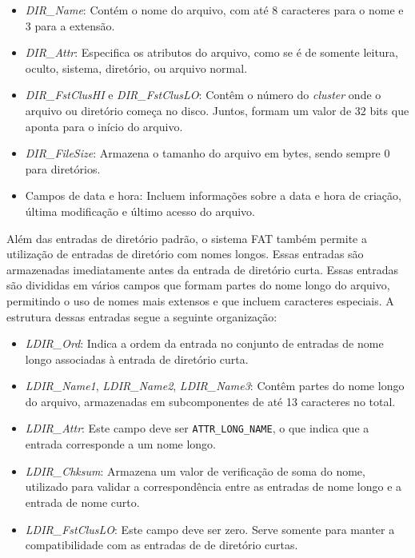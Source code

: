 \documentclass[
    12pt,				%
    oneside,   	        %
    a4paper,			%
    english,			%
    french,				%
    spanish,			%
    brazil,				%
    ]{pacotes/abntex2}
\begin{document}
\begin{itemize} 
    \item \textit{DIR\_Name}: Contém o nome do arquivo, com até 8 caracteres para o nome e 3 para a extensão. 
    \item \textit{DIR\_Attr}: Especifica os atributos do arquivo, como se é de somente leitura, oculto, sistema, diretório, ou arquivo normal.
    \item \textit{DIR\_FstClusHI} e \textit{DIR\_FstClusLO}: Contêm o número do \textit{cluster} onde o arquivo ou diretório começa no disco. Juntos, formam um valor de 32 bits que aponta para o início do arquivo. 
    \item \textit{DIR\_FileSize}: Armazena o tamanho do arquivo em bytes, sendo sempre 0 para diretórios. 
    \item Campos de data e hora: Incluem informações sobre a data e hora de criação, última modificação e último acesso do arquivo. 
\end{itemize}

Além das entradas de diretório padrão, o sistema FAT também permite a utilização de entradas de diretório com nomes longos. Essas entradas são armazenadas imediatamente antes da entrada de diretório curta. Essas entradas são divididas em vários campos que formam partes do nome longo do arquivo, permitindo o uso de nomes mais extensos e que incluem caracteres especiais. A estrutura dessas entradas segue a seguinte organização:

\begin{itemize} 
    \item \textit{LDIR\_Ord}: Indica a ordem da entrada no conjunto de entradas de nome longo associadas à entrada de diretório curta.
    \item \textit{LDIR\_Name1}, \textit{LDIR\_Name2}, \textit{LDIR\_Name3}: Contêm partes do nome longo do arquivo, armazenadas em subcomponentes de até 13 caracteres no total. 
    \item \textit{LDIR\_Attr}: Este campo deve ser \texttt{ATTR\_LONG\_NAME}, o que indica que a entrada corresponde a um nome longo.
    \item \textit{LDIR\_Chksum}: Armazena um valor de verificação de soma do nome, utilizado para validar a correspondência entre as entradas de nome longo e a entrada de nome curto. 
    \item \textit{LDIR\_FstClusLO}: Este campo deve ser zero. Serve somente para manter a compatibilidade com as entradas de de diretório curtas. 
\end{itemize}
\end{document}
